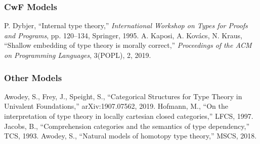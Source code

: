 \documentclass{article}
\begin{document}
\begin{thebibliography}{9}
\subsubsection*{CwF Models}
 P. Dybjer, ``Internal type theory,'' \emph{International Workshop on Types for Proofs and Programs}, pp. 120--134, Springer, 1995.
 A. Kaposi, A. Kovács, N. Kraus, ``Shallow embedding of type theory is morally correct,'' \emph{Proceedings of the ACM on Programming Languages}, 3(POPL), 2, 2019.
\subsubsection*{Other Models}
 Awodey, S., Frey, J., Speight, S., ``Categorical Structures for Type Theory in Univalent Foundations,'' arXiv:1907.07562, 2019.
 Hofmann, M., ``On the interpretation of type theory in locally cartesian closed categories,'' LFCS, 1997.
 Jacobs, B., ``Comprehension categories and the semantics of type dependency,'' TCS, 1993.
 Awodey, S., ``Natural models of homotopy type theory,'' MSCS, 2018.
\end{thebibliography}
\end{document}
